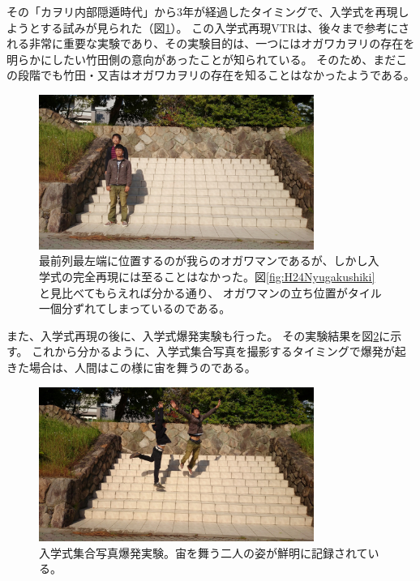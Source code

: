 その「カヲリ内部隠遁時代」から3年が経過したタイミングで、入学式を再現しようとする試みが見られた（図\ref{fig:H24NyugakushikiDummy}）。
この入学式再現VTRは、後々まで参考にされる非常に重要な実験であり、その実験目的は、一つにはオガワカヲリの存在を明らかにしたい竹田側の意向があったことが知られている。
そのため、まだこの段階でも竹田・又吉はオガワカヲリの存在を知ることはなかったようである。

\begin{figure}[H]
  \centering
  \includegraphics[width=0.8\textwidth]{./section/Kawori/figures/H24NyugakushikiDummy.jpg}
  \caption{最前列最左端に位置するのが我らのオガワマンであるが、しかし入学式の完全再現には至ることはなかった。図\ref{fig:H24Nyugakushiki}と見比べてもらえれば分かる通り、
  オガワマンの立ち位置がタイル一個分ずれてしまっているのである。}
\label{fig:H24NyugakushikiDummy}
\end{figure}

また、入学式再現の後に、入学式爆発実験も行った。
その実験結果を図\ref{fig:H24NyugakushikiDummyAbareru}に示す。
これから分かるように、入学式集合写真を撮影するタイミングで爆発が起きた場合は、人間はこの様に宙を舞うのである。

\begin{figure}[H]
  \centering
  \includegraphics[width=0.8\textwidth]{./section/Kawori/figures/H24NyugakushikiDummyAbareru.jpg}
  \caption{入学式集合写真爆発実験。宙を舞う二人の姿が鮮明に記録されている。}
\label{fig:H24NyugakushikiDummyAbareru}
\end{figure}

